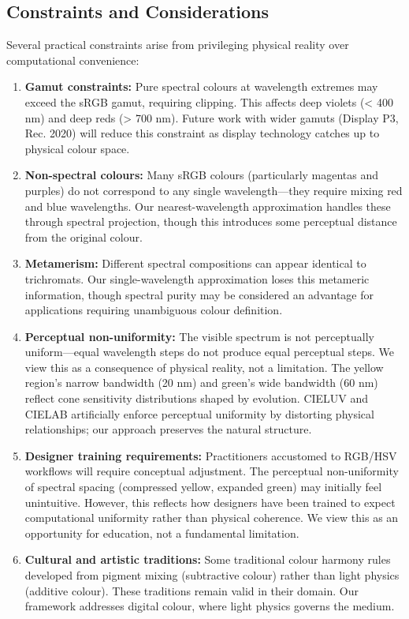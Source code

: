 \documentclass[12pt,a4paper]{article}
\begin{document}
\subsection{Constraints and Considerations}

Several practical constraints arise from privileging physical reality over computational convenience:

\begin{enumerate}
\item \textbf{Gamut constraints:} Pure spectral colours at wavelength extremes may exceed the sRGB gamut, requiring clipping. This affects deep violets (< 400 nm) and deep reds (> 700 nm). Future work with wider gamuts (Display P3, Rec. 2020) will reduce this constraint as display technology catches up to physical colour space.

\item \textbf{Non-spectral colours:} Many sRGB colours (particularly magentas and purples) do not correspond to any single wavelength—they require mixing red and blue wavelengths. Our nearest-wavelength approximation handles these through spectral projection, though this introduces some perceptual distance from the original colour.

\item \textbf{Metamerism:} Different spectral compositions can appear identical to trichromats. Our single-wavelength approximation loses this metameric information, though spectral purity may be considered an advantage for applications requiring unambiguous colour definition.

\item \textbf{Perceptual non-uniformity:} The visible spectrum is not perceptually uniform—equal wavelength steps do not produce equal perceptual steps. We view this as a consequence of physical reality, not a limitation. The yellow region's narrow bandwidth (20 nm) and green's wide bandwidth (60 nm) reflect cone sensitivity distributions shaped by evolution. CIELUV and CIELAB artificially enforce perceptual uniformity by distorting physical relationships; our approach preserves the natural structure.

\item \textbf{Designer training requirements:} Practitioners accustomed to RGB/HSV workflows will require conceptual adjustment. The perceptual non-uniformity of spectral spacing (compressed yellow, expanded green) may initially feel unintuitive. However, this reflects how designers have been trained to expect computational uniformity rather than physical coherence. We view this as an opportunity for education, not a fundamental limitation.

\item \textbf{Cultural and artistic traditions:} Some traditional colour harmony rules developed from pigment mixing (subtractive colour) rather than light physics (additive colour). These traditions remain valid in their domain. Our framework addresses digital colour, where light physics governs the medium.
\end{enumerate}
\end{document}
